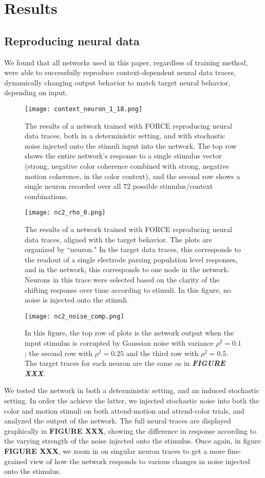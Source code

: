 \documentclass[12pt,a4paper,final]{iopart}
\begin{document}
\section{Results}
\label{sec:res}

\subsection{Reproducing neural data}
We found that all networks used in this paper, regardless of training method, were able to successfully reproduce context-dependent neural data traces, dynamically changing output behavior to match target neural behavior, depending on input.
\begin{figure}[t]
 \centering
 \texttt{[image: context\_neuron\_1\_18.png]}
 \caption{The results of a network trained with FORCE reproducing neural data traces, both in a deterministic setting, and with stochastic noise injected onto the stimuli input into the network. The top row shows the entire network's response to a single stimulus vector (strong, negative color coherence combined with strong, negative motion coherence, in the color context), and the second row shows a single neuron recorded over all $72$ possible stimulus/context combinations.}
\end{figure}
\begin{figure}[t]
 \centering
 \texttt{[image: nc2\_rho\_0.png]}
 \caption{The results of a network trained with FORCE reproducing neural data traces, aligned with the target behavior. The plots are organized by ``neuron." In the target data traces, this corresponds to the readout of a single electrode parsing population level responses, and in the network, this corresponds to one node in the network. Neurons in this trace were selected based on the clarity of the shifting response over time according to stimuli. In this figure, no noise is injected onto the stimuli.}
\end{figure}
\begin{figure}[h!]
 \centering
 \texttt{[image: nc2\_noise\_comp.png]}
 \caption{In this figure, the top row of plots is the network output when the input stimulus is corrupted by Gaussian noise with variance $\rho^2 = 0.1$; the second row with  $\rho^2 = 0.25$ and the third row with $\rho^2 = 0.5$. The target traces for each neuron are the same as in \textbf{\emph{FIGURE XXX}}.}
\end{figure}
We tested the network in both a deterministic setting, and an induced stochastic setting. In order the achieve the latter, we injected stochastic noise into both the color and motion stimuli on both attend-motion and attend-color trials, and analyzed the output of the network. The full neural traces are displayed graphically in \textbf{FIGURE XXX}, showing the difference in response according to the varying strength of the noise injected onto the stimulus. Once again, in figure \textbf{FIGURE XXX}, we zoom in on singular neuron traces to get a more fine-grained view of how the network responds to various changes in noise injected onto the stimulus.
\end{document}
